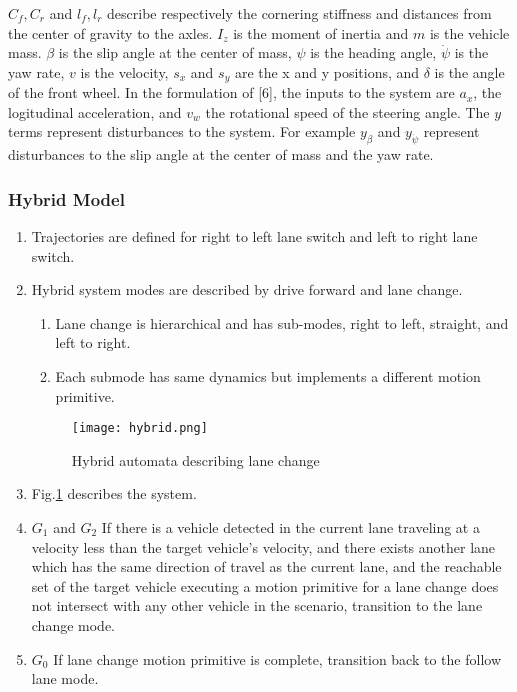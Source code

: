 	\(C_f,C_r\) and \(l_f, l_r\) describe respectively the cornering stiffness and distances from the center of gravity to the axles. \(I_z\) is the moment of inertia and \(m\) is the vehicle mass. \(\beta\) is the slip angle at the center of mass, \(\psi\) is the heading angle, \(\dot{\psi}\) is the yaw rate, \(v\) is the velocity, \(s_x\) and \(s_y\) are the x and y positions, and \(\delta\) is the angle of the front wheel. In the formulation of [6], the inputs to the system are \(a_x\), the logitudinal acceleration, and \(v_w\) the rotational speed of the steering angle. The \(y\) terms represent disturbances to the system. For example \(y_{\beta}\) and \(y_{\dot{\psi}}\) represent disturbances to the slip angle at the center of mass and the yaw rate. 
\subsubsection{Hybrid Model}
	\begin{enumerate}
	\item Trajectories are defined for right to left lane switch and left to right lane switch.
	\item Hybrid system modes are described by drive forward and lane change.
	\begin{enumerate}
		\item Lane change is hierarchical and has sub-modes, right to left, straight, and left to right.
		\item Each submode has same dynamics but implements a different motion primitive.
	\end{enumerate}

		\begin{figure}[tb]
			\label{fig:hybrid}
			\centering
			\texttt{[image: hybrid.png]}
			\caption{Hybrid automata describing lane change}
		\end{figure}
	\item Fig.\ref{fig:hybrid} describes the system.
	\item[] \(G_1\) and \(G_2\) If there is a vehicle detected in the current lane traveling at a velocity less than the target vehicle's velocity, and there exists another lane which has the same direction of travel as the current lane, and the reachable set of the target vehicle executing a motion primitive for a lane change does not intersect with any other vehicle in the scenario, transition to the lane change mode.
	\item[] \(G_0\) If lane change motion primitive is complete, transition back to the follow lane mode.
		\end{enumerate}

